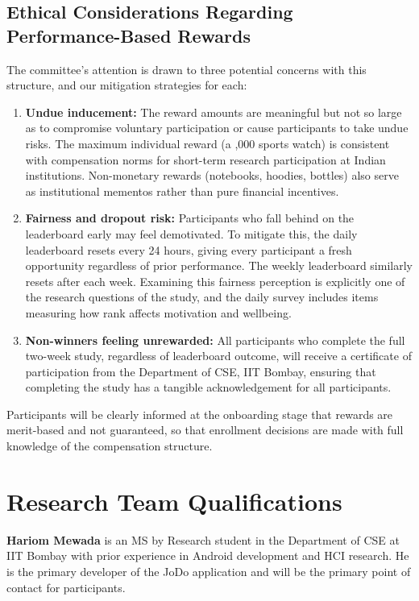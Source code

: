 \documentclass[12pt,a4paper]{article}
\newcommand{\rupee}{\textrupee}
\begin{document}
\subsection*{Ethical Considerations Regarding Performance-Based Rewards}

The committee's attention is drawn to three potential concerns with this 
structure, and our mitigation strategies for each:

\begin{enumerate}

\item \textbf{Undue inducement:} The reward amounts are meaningful but not 
so large as to compromise voluntary participation or cause participants to 
take undue risks. The maximum individual reward (a \rupee3,000 sports watch) 
is consistent with compensation norms for short-term research participation 
at Indian institutions. Non-monetary rewards (notebooks, hoodies, bottles) 
also serve as institutional mementos rather than pure financial incentives.

\item \textbf{Fairness and dropout risk:} Participants who fall behind on 
the leaderboard early may feel demotivated. To mitigate this, the daily 
leaderboard resets every 24 hours, giving every participant a fresh 
opportunity regardless of prior performance. The weekly leaderboard 
similarly resets after each week. Examining this fairness perception is 
explicitly one of the research questions of the study, and the daily 
survey includes items measuring how rank affects motivation and wellbeing.

\item \textbf{Non-winners feeling unrewarded:} All participants who 
complete the full two-week study, regardless of leaderboard outcome, will 
receive a certificate of participation from the Department of CSE, IIT 
Bombay, ensuring that completing the study has a tangible acknowledgement 
for all participants.

\end{enumerate}

Participants will be clearly informed at the onboarding stage that rewards 
are merit-based and not guaranteed, so that enrollment decisions are made 
with full knowledge of the compensation structure.

\section{ Research Team Qualifications}
\textbf{Hariom Mewada} is an MS by Research student in the Department of CSE at IIT Bombay with prior experience in Android development and HCI research. He is the primary developer of the JoDo application and will be the primary point of contact for participants.
\end{document}
